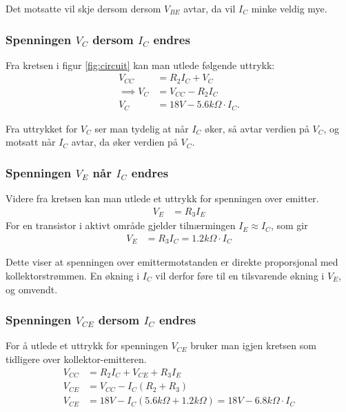             Det motsatte vil skje dersom dersom $V_{BE}$ avtar, da vil $I_C$ minke veldig mye. 

        \subsubsection{Spenningen $V_C$ dersom $I_C$ endres}
            Fra kretsen i figur \ref{fig:circuit} kan man utlede følgende uttrykk:
            \begin{align*}
                V_{CC} &= R_2 I_C + V_C \\ 
                \implies V_C &= V_{CC} - R_2 I_C \\ 
                V_C &= 18V - 5.6k\Omega \cdot I_C.
            \end{align*}

            Fra uttrykket for $V_C$ ser man tydelig at når $I_C$ øker, så avtar verdien på $V_C$, og motsatt når $I_C$ avtar, da øker verdien på $V_C$.

        \subsubsection{Spenningen $V_E$ når $I_C$ endres}   
            Videre fra kretsen kan man utlede et uttrykk for spenningen over emitter.
            \begin{align*}
                V_E &= R_3 I_E 
            \end{align*}
            For en transistor i aktivt område gjelder tilnærmingen $I_E \approx I_C$, som gir 
            \begin{align*}
                V_E &= R_3 I_C = 1.2k\Omega \cdot I_C
            \end{align*}

            Dette viser at spenningen over emittermotstanden er direkte proporsjonal med kollektorstrømmen. En økning i $I_C$ vil derfor føre til en tilsvarende økning i $V_E$, og omvendt.

        \subsubsection{Spenningen $V_{CE}$ dersom $I_C$ endres}
            For å utlede et uttrykk for spenningen $V_{CE}$ bruker man igjen kretsen som tidligere over kollektor-emitteren.
            \begin{align*}
                V_{CC} &= R_2 I_C + V_{CE} + R_3 I_E \\
                V_{CE} &= V_{CC} - I_C (R_2 + R_3) \\
                V_{CE} &= 18V - I_C (5.6k\Omega + 1.2k\Omega) = 18V - 6.8k\Omega \cdot I_C
            \end{align*}

